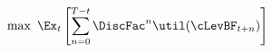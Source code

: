 \begin{eqnarray}
  \label{eq:supfn}
  \max~ \Ex_{t}\left[\sum_{n=0}^{T-t} \DiscFac^{n} \util(\cLevBF_{t+n})\right]
\end{eqnarray}
